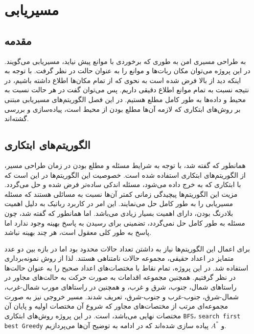 \chapter{مسیریابی}\label{ch path planning}

\section{مقدمه}

به طراحی مسیری امن به طوری که برخوردی با موانع پیش نیاید، مسیریابی می‌گویند. در این پروژه می‌توان مکان ربات‌ها و موانع را به عنوان حالت در نظر گرفت. با توجه به اینکه دید از بالا فرض شده است به نحوی که از تمام مکان‌ها اطلاع داشته باشیم، در نتیجه نسبت به تمام موانع اطلاع دقیقی داریم. پس می‌توان گفت در هر حالت نسبت به محیط و داده‌ها به طور کامل مطلع هستیم. در این فصل الگوریتم‌های مسیریابی مبتنی بر روش‌های ابتکاری که لازمه آن‌ها مطلع بودن از محیط است، پیاده‌سازی و بررسی گشته‌اند.

\section{الگوریتم‌های ابتکاری}
همانطور که گفته شد، با توجه به شرایط مسئله و مطلع بودن در زمان طراحی مسیر، از الگوریتم‌های ابتکاری استفاده شده است. خصوصیت این الگوریتم‌ها در این است که با ابتکاری که به خرج داده می‌شود، مسئله اندکی ساده‌تر فرض شده و حل می‌گردد. مزیت این الگوریتم‌ها پیچیدگی زمانی کمتر آن‌ها نسبت به مسائلی هستند که مسئله مسیریابی را به طور کامل حل می‌نمایند. این امر در کاربرد رباتیک به دلیل اهمیت بلادرنگ بودن، دارای اهمیت بسیار زیادی می‌باشد. اما همانطور که گفته شد، چون مسئله به طور کامل حل نمی‌گردد، تضمینی برای رسیدن به پاسخ بهینه وجود ندارد اما پاسخ به طور کلی معقول است، هر چند بهینه نباشد.

برای اعمال این الگوریتم‌ها نیاز به داشتن تعداد حالات محدود بود اما در بازه بین دو عدد متمایز در اعداد حقیقی، مجموعه حالات نامتناهی هستند. لذا از روش نمونه‌برداری استفاده شد. در این پروژه، تمام نقاط با مختصات‌های اعداد صحیح را به عنوان حالت‌ها در نظر گرفتیم. همچنین مجموعه اقدامات به صورت حرکت به حالت‌های مجاور در راستاهای شمال، جنوب، شرق و غرب، و همچنین در راستاهای مورب شمال-غرب، شمال-شرق، جنوب-غرب و جنوب-شرق، تعریف شدند. مسیر خروجی نیز به صورت مجموعه‌ای مرتب از مختصات‌های مجاور که شروع آن مختصات اولیه و پایان آن مختصات نهایی می‌باشد، است. در این پروژه روش‌های ابتکاری \verb|BFS|، \verb|search first best Greedy| و $A^*$ پیاده سازی شده‌اند که در ادامه به توضیح آن‌ها می‌پردازیم.

